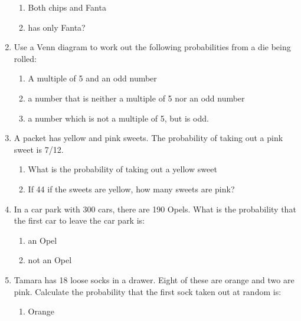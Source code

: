 \begin{enumerate}[noitemsep, label=\textbf{\arabic*}. ]
\label{m39373*id115906}\begin{enumerate}[noitemsep, label=\textbf{\alph*}. ] 
            \label{m39373*uid106}\item Both chips and Fanta
\label{m39373*uid107}\item has only Fanta?
\end{enumerate}
                \label{m39373*uid108}\item Use a Venn diagram to work out the following
probabilities from a die being rolled:
\label{m39373*id115948}\begin{enumerate}[noitemsep, label=\textbf{\alph*}. ] 
            \label{m39373*uid109}\item A multiple of 5 and an odd number
\label{m39373*uid110}\item a number that is neither a multiple of 5 nor an odd
number
\label{m39373*uid111}\item a number which is not a multiple of 5, but is odd.
\end{enumerate}
                \label{m39373*uid112}\item A packet has yellow and pink sweets. The probability
of taking out a pink sweet is 7/12.
\label{m39373*id116002}\begin{enumerate}[noitemsep, label=\textbf{\alph*}. ] 
            \label{m39373*uid113}\item What is the probability of taking
out a yellow sweet
\label{m39373*uid114}\item If 44 if the sweets are yellow, how many sweets are
pink?
\end{enumerate}
                \label{m39373*uid115}\item In a car park with 300 cars, there are 190 Opels. What
is the probability that the first car to leave the car park is:
\label{m39373*id116044}\begin{enumerate}[noitemsep, label=\textbf{\alph*}. ] 
            \label{m39373*uid116}\item an Opel
\label{m39373*uid117}\item not an Opel
\end{enumerate}
                \label{m39373*uid118}\item Tamara has 18 loose socks in a drawer. Eight of these
are orange and two are pink. Calculate the probability that the first sock taken
out at random is:
\label{m39373*id116086}\begin{enumerate}[noitemsep, label=\textbf{\alph*}. ] 
            \label{m39373*uid119}\item Orange

\end{enumerate}
\end{enumerate}
